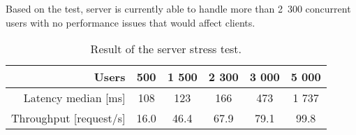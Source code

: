 Based on the test, server is currently able to handle more than 2~300 concurrent users with no performance issues that would affect clients.

\begin{table}
	\centering
	\begin{tabular}{r || c | c | c | c | c |}
		Users & 500 & 1 500 & 2 300 & 3 000 & 5 000 \\ \hline 
		Latency median [ms] & 108 & 123 & 166 & 473 & 1 737 \\
		Throughput [request/s] & 16.0 & 46.4 & 67.9 & 79.1 & 99.8 \\
	\end{tabular}
	\caption{Result of the server stress test. \cite{dbengines}}
	\label{tab:loadtestresults}
\end{table}	

